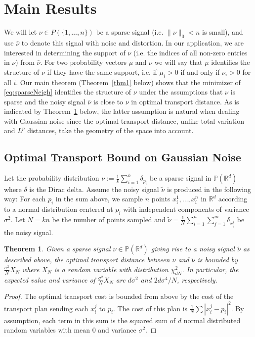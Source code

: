 \documentclass[conference]{IEEEtran}
\newcommand{\R}{{\mathbb{R}}}
\newcommand{\bbP}{{\mathbb{P}}}
\newtheorem{theorem}{Theorem}
\begin{document}
\section{Main Results}\label{sec:MainResults}
We will let $\nu\in P(\{1,\ldots,n\})$ be a sparse signal (i.e. $\|\nu\|_0<n$ is small), and use $\bar\nu$ to denote this signal with noise and distortion. In our application, we are interested in determining the support of $\nu$ (i.e. the indices of all non-zero entries in $\nu$) from $\bar\nu$. For two probability vectors $\mu$ and $\nu$ we will say that $\mu$ identifies the structure of $\nu$ if they have the same support, i.e. if $\mu_i>0$ if and only if $\nu_i>0$ for all $i$. Our main theorem (Theorem~\ref{thm1} below) shows that the minimizer of \eqref{eq:sparseNeigh} identifies the structure of $\nu$ under the assumptions that $\nu$ is sparse and the noisy signal $\bar\nu$ is close to $\nu$ in optimal transport distance. As is indicated by Theorem~\ref{thm:NoiseBound} below, the latter assumption is natural when dealing with Gaussian noise since the optimal transport distance, unlike total variation and $L^p$ distances, take the geometry of the space into account. 

\subsection{Optimal Transport Bound on Gaussian Noise}
Let the probability distribution $\nu:=\frac{1}{k}\sum_{i=1}^k \delta_{p_i}$ be a sparse signal in $\bbP(\R^d)$ where $\delta$ is the Dirac delta. Assume the noisy signal $\tilde\nu$ is produced in the following way: For each $p_i$ in the sum above, we sample $n$ points $x_i^1,\ldots,x_i^n$ in $\R^d$ according to a normal distribution centered at $p_i$ with independent components of variance $\sigma^2$. Let $N=kn$ be the number of points sampled and $\tilde\nu=\frac{1}{N}\sum_{i=1}^n \sum_{j=1}^m\delta_{x_i^j}$ be the noisy signal. 
\begin{theorem}
\label{thm:NoiseBound}
    Given a sparse signal $\nu\in\bbP(\R^d)$ giving rise to a noisy signal $\tilde\nu$ as described above, the optimal transport distance between $\nu$ and $\tilde\nu$ is bounded by $\frac{\sigma^2}{N}X_N$ where $X_N$ is a random variable with distribution $\chi^2_{dN}$. In particular, the expected value and variance of $\frac{\sigma^2}{N}X_N$ are $d\sigma^2$ and $2d\sigma^4/N$, respectively. 
\end{theorem}
\begin{proof}
    The optimal transport cost is bounded from above by the cost of the transport plan sending each $x_i^j$ to $p_i$. The cost of this plan is 
    $\frac{1}{N}\sum |x_i^j-p_i|^2 $. By assumption, each term in this sum is the squared sum of $d$ normal distributed random variables with mean 0 and variance $\sigma^2$. 
\end{proof}
\end{document}
